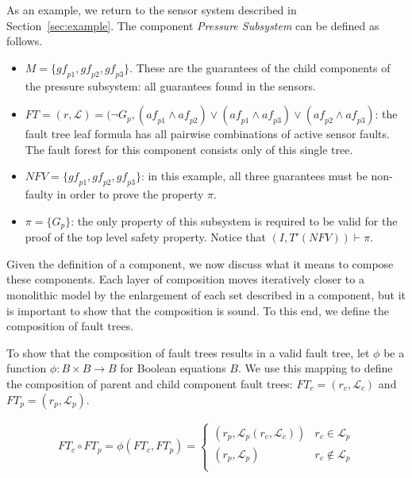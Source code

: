 As an example, we return to the sensor system described in Section~\ref{sec:example}. The component {\em Pressure Subsystem} can be defined as follows. 

\begin{itemize}[label=\textbullet]
\item $M = \{\mathit{gf}_{p1}, \mathit{gf}_{p2}, \mathit{gf}_{p3}\}$. 
These are the guarantees of the child components of the pressure subsystem: all guarantees found in the sensors. 
\item $\mathit{FT} = (r, \mathcal{L}) = (\neg G_p, (\mathit{af}_{p1} \land \mathit{af}_{p2}) \lor (\mathit{af}_{p1} \land \mathit{af}_{p3}) \lor (\mathit{af}_{p2} \land \mathit{af}_{p3}) $: the fault tree leaf formula has all pairwise combinations of active sensor faults. The fault forest for this component consists only of this single tree.
\item $\mathit{NFV} = \{\mathit{gf}_{p1}, \mathit{gf}_{p2}, \mathit{gf}_{p3}\}$: in this example, all three guarantees must be non-faulty in order to prove the property $\pi$.
\item $\pi = \{G_p\}$: the only property of this subsystem is required to be valid for the proof of the top level safety property. Notice that $(I, T'(\mathit{NFV})) \vdash \pi$.
\end{itemize}



Given the definition of a component, we now discuss what it means to compose these components. Each layer of composition moves iteratively closer to a monolithic model by the enlargement of each set described in a component, but it is important to show that the composition is sound. To this end, we define the composition of fault trees. 

To show that the composition of fault trees results in a valid fault tree, let $\phi$ be a function $\phi : B \times B \rightarrow B$ for Boolean equations $B$. We use this mapping to define the composition of parent and child component fault trees: $\mathit{FT}_c = (r_c, \mathcal{L}_c)$ and $\mathit{FT}_p = (r_p, \mathcal{L}_p)$.

\begin{gather}
\mathit{FT}_c \circ \mathit{FT}_p = \phi(\mathit{FT}_c, \mathit{FT}_p) =\begin{cases} 
      (r_p, \mathcal{L}_p(r_c, \mathcal{L}_c)) & r_c \in \mathcal{L}_p \\
      (r_p, \mathcal{L}_p) & r_c \not\in \mathcal{L}_p \\
   \end{cases}
\label{eq:phi}
\end{gather}

